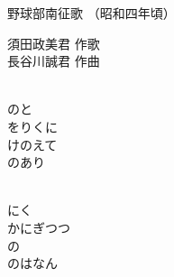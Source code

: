 \documentclass[10pt,b5j]{tarticle} %
\begin{document}
\begin{minipage}[c]{0.7\hsize} %
    \begin{center}
        {\LARGE
            野球部南征歌 %
        }
        {\small 
            （昭和四年頃） %
        }
    \end{center}
\end{minipage}
\begin{minipage}[c]{0.3\hsize} %
    \begin{flushright} %
        須田政美君 作歌\\長谷川誠君 作曲 %
    \end{flushright}
\end{minipage}

\vspace{1.5em} %
\newcommand{\linespace}{0.5em} %
\newcommand{\blocksize}{0.5\hsize} %
\newcommand{\itemmargin}{3em} %
\begin{enumerate} %
    \setlength{\itemindent}{\itemmargin} %
    \begin{minipage}[c]{\blocksize}
    
        \vspace{\linespace}
        \item~\\
        のと\\
        をりくに\\
        けのえて\\
        のあり
        
    \end{minipage}
    \begin{minipage}[c]{\blocksize}
        
        \vspace{\linespace}
        \item~\\
        にく\\
        かにぎつつ\\
        の\\
        のはなん
    
    \end{minipage}
\end{enumerate} %
\end{document}
